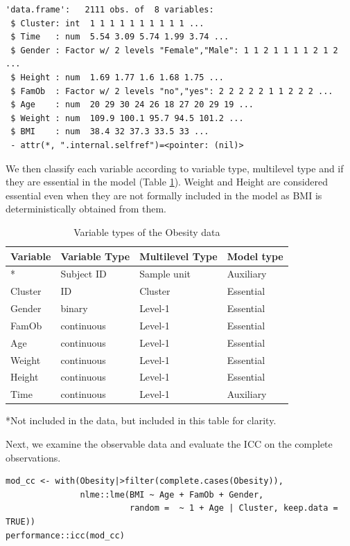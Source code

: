 \documentclass[
  article]{jss}
\begin{document}
\begin{verbatim}
'data.frame':   2111 obs. of  8 variables:
 $ Cluster: int  1 1 1 1 1 1 1 1 1 1 ...
 $ Time   : num  5.54 3.09 5.74 1.99 3.74 ...
 $ Gender : Factor w/ 2 levels "Female","Male": 1 1 2 1 1 1 1 2 1 2 ...
 $ Height : num  1.69 1.77 1.6 1.68 1.75 ...
 $ FamOb  : Factor w/ 2 levels "no","yes": 2 2 2 2 2 1 1 2 2 2 ...
 $ Age    : num  20 29 30 24 26 18 27 20 29 19 ...
 $ Weight : num  109.9 100.1 95.7 94.5 101.2 ...
 $ BMI    : num  38.4 32 37.3 33.5 33 ...
 - attr(*, ".internal.selfref")=<pointer: (nil)> 
\end{verbatim}

We then classify each variable according to variable type, multilevel
type and if they are essential in the model (Table \ref{tbl-typeobs}).
Weight and Height are considered essential even when they are not
formally included in the model as BMI is deterministically obtained from
them.

\begin{longtable}[]{@{}llll@{}}

\caption{\label{tbl-typeobs}Variable types of the Obesity data}

\tabularnewline

\toprule\noalign{}
Variable & Variable Type & Multilevel Type & Model type \\
\midrule\noalign{}
\endhead
\bottomrule\noalign{}
\endlastfoot
* & Subject ID & Sample unit & Auxiliary \\
Cluster & ID & Cluster & Essential \\
Gender & binary & Level-1 & Essential \\
FamOb & continuous & Level-1 & Essential \\
Age & continuous & Level-1 & Essential \\
Weight & continuous & Level-1 & Essential \\
Height & continuous & Level-1 & Essential \\
Time & continuous & Level-1 & Auxiliary \\

\end{longtable}

\footnotesize

*Not included in the data, but included in this table for clarity.

Next, we examine the observable data and evaluate the ICC on the
complete observations.

\begin{verbatim}
mod_cc <- with(Obesity|>filter(complete.cases(Obesity)),
               nlme::lme(BMI ~ Age + FamOb + Gender, 
                         random =  ~ 1 + Age | Cluster, keep.data = TRUE))
performance::icc(mod_cc)
\end{verbatim}
\end{document}
